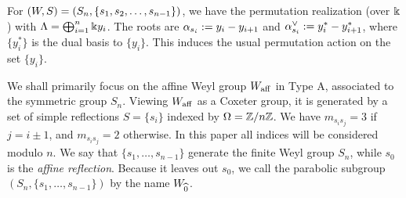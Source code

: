 \begin{example}
    For $(W,S)=(S_n, \{s_1, s_2, \ldots, s_{n-1}\})$, we have the permutation realization (over $\Bbbk$) with $\Lambda=\bigoplus_{i=1}^n\Bbbk y_i$. 
    The roots are $ \alpha_{s_i} := y_i-y_{i+1}$ and $\alpha_{s_i}^\vee:= y_i^*-y_{i+1}^*$, where $\{y_i^*\}$ is the dual basis to $\{y_i\}$. This induces the usual permutation action on the set $\{y_i\}$.
\end{example}

We shall primarily focus on the affine Weyl group $W_{\operatorname{aff}}$ in Type A, associated to the symmetric group $S_n$. Viewing $W_{\operatorname{aff}}$ as a Coxeter group, it is generated by a set of simple reflections $S = \{s_i\}$ indexed by $\Omega = \mathbb{Z}/n\mathbb{Z}$. We have $m_{s_i s_j} = 3$ if $j = i \pm 1$, and $m_{s_i
s_j} = 2$ otherwise. In this paper all indices will be considered modulo $n$. We say that $\{s_1, \ldots, s_{n-1}\}$ generate the finite Weyl group $S_n$, while $s_0$ is the \emph{affine reflection}. Because it leaves out $s_0$, we call the parabolic subgroup $(S_n,\{s_1, \ldots, s_{n-1}\})$ by the name $W_{\widehat{0}}$. 

